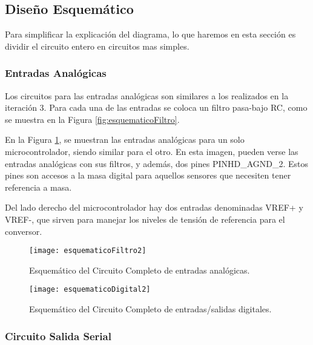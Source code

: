 \subsection{Diseño Esquemático}
\label{sub: diseño_esquematico2}

Para simplificar la explicación del diagrama, lo que haremos en esta sección es dividir el circuito entero en circuitos mas simples.

\subsubsection{Entradas Analógicas}
\label{subsub: entradas_analogicas2}

Los circuitos para las entradas analógicas son similares a los realizados en la iteración 3. Para cada una de las entradas se coloca un filtro pasa-bajo RC, como se muestra en la Figura \ref{fig:esquematicoFiltro}.

En la Figura \ref{fig:esquematicoFiltro2}, se muestran las entradas analógicas para un solo microcontrolador, siendo similar para el otro. En esta imagen, pueden verse las entradas analógicas con sus filtros, y además, dos pines PINHD\_AGND\_2. Estos pines son accesos a la masa digital para aquellos sensores que necesiten tener referencia a masa.

Del lado derecho del microcontrolador hay dos entradas denominadas VREF+ y VREF-, que sirven para manejar los niveles de tensión de referencia para el conversor.

\begin{figure}[h]
\centering
  \texttt{[image: esquematicoFiltro2]}
  \caption{Esquemático del Circuito Completo de entradas analógicas.}\label{fig:esquematicoFiltro2}
\end{figure}



\begin{figure}[h]
\centering
  \texttt{[image: esquematicoDigital2]}
  \caption{Esquemático del Circuito Completo de entradas/salidas digitales.}\label{fig:esquematicoDigital2}
\end{figure}



\subsubsection{Circuito Salida Serial}
\label{subsub:salida_serial2}

